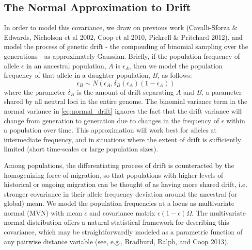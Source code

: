 \documentclass[12pt]{article}
\begin{document}
\subsection*{The Normal Approximation to Drift}
In order to model this covariance, we draw on previous work (Cavalli-Sforza \& Edwards, Nicholson et al 2002, Coop et al 2010, Pickrell \& Pritchard 2012), and model the process of genetic drift - the compouding of binomial sampling over the generations - as approximately Gaussian.  Briefly, if the population frequency of allele $\epsilon$ in an ancestral population, $A$ is $\epsilon_A$, then we model the population frequency of that allele in a daughter population, $B$, as follows:
\begin{equation}
\label{eq:normal_drift}
\epsilon_B \sim N(\epsilon_A,\delta_B(\epsilon_A)(1-\epsilon_A))
\end{equation}
where the parameter  $\delta_B$ is the amount of drift separating $A$ and $B$, a parameter shared by all neutral loci in the entire genome.  The binomial variance term in the normal variance in \eqref{eq:normal_drift} ignores the fact that the drift variance will change from generation to generation due to changes in the frequency of $\epsilon$ within a population over time.  This approximation will work best for alleles at intermediate frequency, and in situations where the extent of drift is sufficiently limited (short time-scales or large population sizes). 

Among populations, the differentiating process of drift is counteracted by the homogenizing force of migration, so that populations with higher levels of historical or ongoing migration can be thought of as having more shared drift, i.e. stronger covariance in their allele frequency deviation around the ancestral (or global) mean. We model the population frequencies at a locus as multivariate normal (MVN) with mean $\epsilon$ and covariance matrix $\epsilon (1-\epsilon)\Omega$. The multivariate normal distribution offers a natural statistical framework for describing this covariance, which may be straightforwardly modeled as a parametric function of any pairwise distance variable (see, e.g., Bradburd, Ralph, and Coop 2013). 


\end{document}
